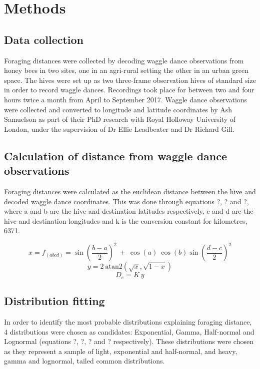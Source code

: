 \documentclass[11pt,usenames,dvipsnames]{article}
\begin{document}
\section{Methods}

\subsection{Data collection}
Foraging distances were collected by decoding waggle dance observations from honey bees in two sites, one in an agri-rural setting the other in an urban green space. The hives were set up as two three-frame observation hives of standard size in order to record waggle dances. Recordings took place for between two and four hours twice a month from April to September 2017. Waggle dance observations were collected and converted to longitude and latitude coordinates by Ash Samuelson as part of their PhD research with Royal Holloway University of London, under the supervision of Dr Ellie Leadbeater and Dr Richard Gill.


\subsection{Calculation of distance from waggle dance observations}
Foraging distances were calculated as the euclidean distance between the hive and decoded waggle dance coordinates. This was done through equations ?, ? and ?, where a and b are the hive and destination latitudes respectively, c and d are the hive and destination longitudes and k is the conversion constant for kilometres, 6371.

\begin{equation}
x = f_{(abcd)} = \sin\left(\frac{b - a}{2}\right)^2\ +\ \cos(a)\ \cos(b) \sin\left(\frac{d - c}{2}\right)^2 
\end{equation}
\begin{equation}
y = 2\ \text{atan2}(\sqrt{x}, \sqrt{1 - x})
\end{equation}
\begin{equation}
D_e = K\ y
\end{equation}

\subsection{Distribution fitting}

In order to identify the most probable distributions explaining foraging distance, 4 distributions were chosen as candidates: Exponential, Gamma, Half-normal and Lognormal (equations ?, ?, ? and ? respectively). These distributions were chosen as they represent a sample of light, exponential and half-normal, and heavy, gamma and lognormal, tailed common distributions.
\end{document}
